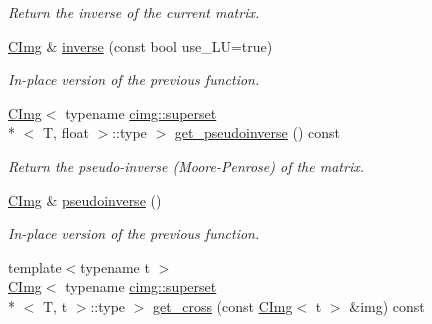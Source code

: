 \begin{DoxyCompactItemize}
\begin{DoxyCompactList}\small\item\em Return the inverse of the current matrix. \end{DoxyCompactList}\item 
\hypertarget{structcimg__library_1_1_c_img_abaeeed53c26e52bb8f518242df202267}{\hyperlink{structcimg__library_1_1_c_img}{C\-Img} \& \hyperlink{structcimg__library_1_1_c_img_abaeeed53c26e52bb8f518242df202267}{inverse} (const bool use\-\_\-\-L\-U=true)}\label{structcimg__library_1_1_c_img_abaeeed53c26e52bb8f518242df202267}

\begin{DoxyCompactList}\small\item\em In-\/place version of the previous function. \end{DoxyCompactList}\item 
\hypertarget{structcimg__library_1_1_c_img_a6b481814a16bf20ccfac3db07e675384}{\hyperlink{structcimg__library_1_1_c_img}{C\-Img}$<$ typename \hyperlink{structcimg__library_1_1cimg_1_1superset}{cimg\-::superset}\\*
$<$ T, float $>$\-::type $>$ \hyperlink{structcimg__library_1_1_c_img_a6b481814a16bf20ccfac3db07e675384}{get\-\_\-pseudoinverse} () const }\label{structcimg__library_1_1_c_img_a6b481814a16bf20ccfac3db07e675384}

\begin{DoxyCompactList}\small\item\em Return the pseudo-\/inverse (Moore-\/\-Penrose) of the matrix. \end{DoxyCompactList}\item 
\hypertarget{structcimg__library_1_1_c_img_a98c73e6910ed84eb7e9fe23a7e822f04}{\hyperlink{structcimg__library_1_1_c_img}{C\-Img} \& \hyperlink{structcimg__library_1_1_c_img_a98c73e6910ed84eb7e9fe23a7e822f04}{pseudoinverse} ()}\label{structcimg__library_1_1_c_img_a98c73e6910ed84eb7e9fe23a7e822f04}

\begin{DoxyCompactList}\small\item\em In-\/place version of the previous function. \end{DoxyCompactList}\item 
\hypertarget{structcimg__library_1_1_c_img_ac7e6e9c4389db1c5abf2d04f6f488290}{{\footnotesize template$<$typename t $>$ }\\\hyperlink{structcimg__library_1_1_c_img}{C\-Img}$<$ typename \hyperlink{structcimg__library_1_1cimg_1_1superset}{cimg\-::superset}\\*
$<$ T, t $>$\-::type $>$ \hyperlink{structcimg__library_1_1_c_img_ac7e6e9c4389db1c5abf2d04f6f488290}{get\-\_\-cross} (const \hyperlink{structcimg__library_1_1_c_img}{C\-Img}$<$ t $>$ \&img) const }\label{structcimg__library_1_1_c_img_ac7e6e9c4389db1c5abf2d04f6f488290}


\end{DoxyCompactItemize}
